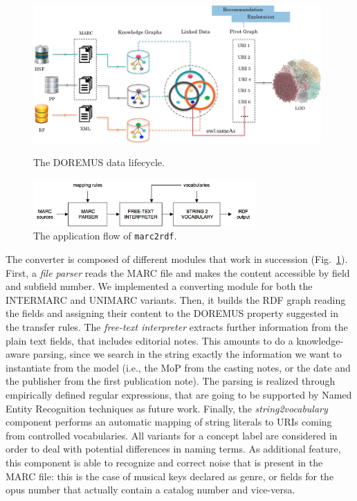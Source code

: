 \begin{figure}[t]
\center
	\includegraphics[width=11cm]{img/DRMS-WRKFL.png}
	\caption{The DOREMUS data lifecycle.}
	\label{fig:doremus}
\smallskip
  \centering
  \includegraphics[width=8.5cm]{img/marc2rdf_schema.png}
  \caption{The application flow of \texttt{marc2rdf}.}
  \label{fig:marc2rdf}
\end{figure}

The converter is composed of different modules that work in succession (Fig.~\ref{fig:marc2rdf}). First, a \textit{file parser} reads the MARC file and makes the content accessible by field and subfield number. We implemented a converting module for both the INTERMARC and UNIMARC variants. Then, it builds the RDF graph reading the fields and assigning their content to the DOREMUS property suggested in the transfer rules. The \textit{free-text interpreter} extracts further information from the plain text fields, that includes editorial notes. This amounts to do a knowledge-aware parsing, since we search in the string exactly the information we want to instantiate from the model (i.e., the MoP from the casting notes, or the date and the publisher from the first publication note). The parsing is realized through empirically defined regular expressions, that are going to be supported by Named Entity Recognition techniques as future work. Finally, the \textit{string2vocabulary} component performs an automatic mapping of string literals to URIs coming from controlled vocabularies. All variants for a concept label are considered in order to deal with potential differences in naming terms. As additional feature, this component is able to recognize and correct noise that is present in the MARC file: this is the case of musical keys declared as genre, or fields for the opus number that actually contain a catalog number and vice-versa.

